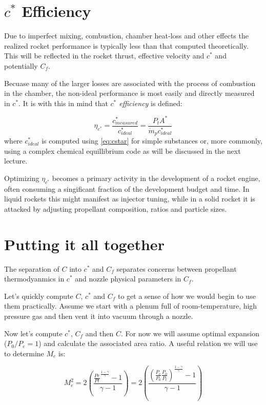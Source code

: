 \documentclass[twocolumn]{memoir} %
\begin{document}
\section{$c^*$ Efficiency}
Due to imperfect mixing, combustion, chamber heat-loss and other effects the
realized rocket performance is typically less than that computed theoretically.
This will be reflected in the rocket thrust, effective velocity and $c^*$ and potentially
$C_f$.

Becuase many of the larger losses are associated with the process of combustion
in the chamber, the non-ideal performance is most easily and directly measured in
$c^*$.  It is with this in mind that \emph{$c^*$ efficiency} is defined:

\begin{equation}
    \eta_{c^*} = \frac{c^*_{measured}}{c^*_{ideal}} = \frac{P_t A^*}{\dot{m}_p c^*_{ideal}}
\end{equation}
%
where $c^*_{ideal}$ is computed using \cref{eq:cstar} for simple substances or, more
commonly, using a complex chemical equillibrium code as will be discussed in the next
lecture.

Optimizing $\eta_{c^*}$ becomes a primary activity in the development of a rocket
engine, often consuming a singificant fraction of the development budget and time.  In
liquid rockets this might manifest as injector tuning, while in a solid rocket it is
attacked by adjusting propellant composition, ratios and particle sizes.

\section{Putting it all together}\label{putting-it-all-together}

The separation of \(C\) into \(c^*\) and \(C_f\) separates
concerns between propellant thermodyanmics in \(c^*\) and nozzle
physical parameters in \(C_f\).

Let's quickly compute \(C\), \(c^*\) and \(C_f\) to get a sense of
how we would begin to use them practically. Assume we start with a
plenum full of room-temperature, high pressure gas and then vent it
into vacuum through a nozzle. 

Now let's compute \(c^*\), \(C_f\) and then \(C\). For now we will
assume optimal expansion ($P_0/P_e = 1$) and calculate the associated area ratio. A
useful relation we will use to determine \(M_e\) is:

\begin{equation}
    M_e^2 = 2\left(\frac{\frac{Pe}{Pt}^{\frac{1-\gamma}{\gamma}}-1}{\gamma-1}\right) = 2\left(\frac{\left(\frac{P_e}{P_0}\frac{P_0}{P_t}\right)^{\frac{1-\gamma}{\gamma}}-1}{\gamma-1}\right)
\end{equation}
\end{document}
